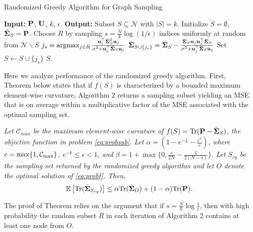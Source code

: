 \renewcommand\algorithmicdo{}	%
\begin{algorithm}[t]
\caption{Randomized Greedy Algorithm for Graph Sampling}
\label{alg:greedy}
\begin{algorithmic}[1]
    \STATE \textbf{Input:}  $\P$, $\U$, $k$, $\epsilon$.
    \STATE \textbf{Output:} Subset $S\subseteq \mathcal{N} $ with $|S|=k$.
    \STATE Initialize $S =  \emptyset$, $\bar{\S}_{S}=\P$.
	\vspace{0.1cm}
			\STATE Choose $R$ by sampling $s=\frac{N}{k}\log{(1/\epsilon)}$ indices uniformly at random from $\mathcal{N}\backslash S$
            \STATE $j_s = \argmax_{j\in R} \frac{\u_j^\top\bar{\S}_S^{2}\u_j}{\sigma^{2}+\u_j^\top\bar{\S}_S\u_j}$\vspace{0.1cm}
            \STATE $\bar{\S}_{S \cup\{j_s\}} = \bar{\S}_S-\frac{\bar{\S}_{S}\u_{j}\u_{j}^\top\bar{\S}_{S}}{\sigma^2+\u_{j}^\top\bar{\S}_{S}\u_{j}}$\vspace{0.1cm}
            \STATE Set $S \leftarrow S\cup \{j_s\}$\vspace{0.1cm}
	\ENDWHILE
	\RETURN $S$.
\end{algorithmic}
\end{algorithm}

 Here we analyze performance of the randomized greedy algorithm. First, Theorem  below states that if $f(S)$ is characterized by a bounded maximum element-wise curvature, Algorithm 2 returns a sampling subset yielding an MSE that is on average within a multiplicative factor of the MSE associated with the optimal sampling set.
%
\begin{theorem}\label{thm:exp}
\textit{Let $\mathcal{C}_{max}$ be the maximum element-wise curvature of $f(S) = \mathrm{Tr}(\P-\bar{\S}_S)$, the objective function in problem \ref{eq:probsub}. Let $\alpha =(1-e^{-\frac{1}{c}}-\frac{\epsilon^\beta}{c})$, where $c=\max\{1,{\cal C}_{\max}\}$, $e^{-k}\leq\epsilon<1$, and $\beta = 1+\max\{0,\frac{s}{2N}-\frac{1}{2(N-s)}\}$. Let $S_{rg}$ be the sampling set returned by the randomized greedy algorithm and let $O$ denote the optimal solution of \ref{eq:probf}. Then,}
%
\begin{equation}\label{eq:expbound}
\E\left[\mathrm{Tr}(\bar{\S}_{S_{rg}})\right]\leq \alpha \mathrm{Tr}(\bar{\S}_{O}) + (1-\alpha) \mathrm{Tr}(\P).
\end{equation}
%
\end{theorem}
%
The proof of Theorem  relies on the argument that if $s = \frac{N}{k}\log\frac{1}{\epsilon}$, then with high probability the random subset $R$ in each iteration of Algorithm 2 contains at least one node from $O$.

